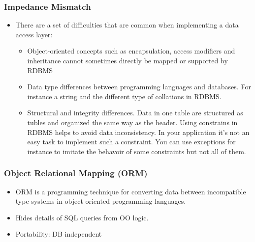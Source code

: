 \documentclass{beamer}
\begin{document}
\begin{frame}
	\frametitle{Impedance Mismatch}
	\begin{itemize}
	\item There are a set of difficulties that are common when implementing a data access layer:
	\begin{itemize}
		\item Object-oriented concepts such as encapsulation, access modifiers and inheritance cannot sometimes directly be mapped or supported by RDBMS 
		\pause
		\item Data type differences between programming languages  and databases. For instance a string and the different type of collations in RDBMS. 
		\pause
		\item Structural and integrity differences. Data in one table are structured as tubles and organized the same way as the header. Using constrains in RDBMS helps to avoid data inconsistency. In your application it's not an easy task to implement such a constraint. You can use exceptions for instance to imitate the behavoir of some constraints  but not all of them.
	\end{itemize}
\end{itemize}
\end{frame}	

\begin{frame}
	\frametitle{Object Relational Mapping (ORM)}
	\begin{itemize}
	\item ORM is a programming technique for converting data between incompatible type systems in object-oriented programming languages. 
	\item Hides details of SQL queries from OO logic.
	\pause 
	\item Portability: DB independent
	\pause 
\end{itemize}
\end{frame}	
\end{document}
